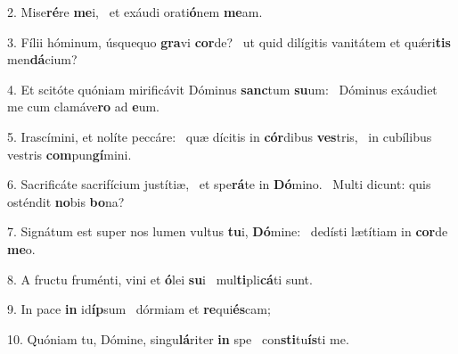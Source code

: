 2. Mise\textbf{ré}re \textbf{me}i, \ast\  et exáudi orati\textbf{ó}nem \textbf{me}am.\

3. Fílii hóminum, úsquequo \textbf{gra}vi \textbf{cor}de? \ast\  ut quid dilígitis vanitátem et quǽri\textbf{tis} men\textbf{dá}cium?\

4. Et scitóte quóniam mirificávit Dóminus \textbf{sanc}tum \textbf{su}um: \ast\  Dóminus exáudiet me cum clamáve\textbf{ro} ad \textbf{e}um.\

5. Irascímini, et nolíte peccáre: \dag\  quæ dícitis in \textbf{cór}dibus \textbf{ves}tris, \ast\  in cubílibus vestris \textbf{com}pun\textbf{gí}mini.\

6. Sacrificáte sacrifícium justítiæ, \dag\  et spe\textbf{rá}te in \textbf{Dó}mino. \ast\  Multi dicunt: quis osténdit \textbf{no}bis \textbf{bo}na?\

7. Signátum est super nos lumen vultus \textbf{tu}i, \textbf{Dó}mine: \ast\  dedísti lætítiam in \textbf{cor}de \textbf{me}o.\

8. A fructu fruménti, vini et \textbf{ó}lei \textbf{su}i \ast\  mul\textbf{ti}pli\textbf{cá}ti sunt.\

9. In pace \textbf{in} id\textbf{íp}sum \ast\  dórmiam et \textbf{re}qui\textbf{és}cam;\

10. Quóniam tu, Dómine, singu\textbf{lá}riter \textbf{in} spe \ast\  con\textbf{sti}tu\textbf{ís}ti me.\

